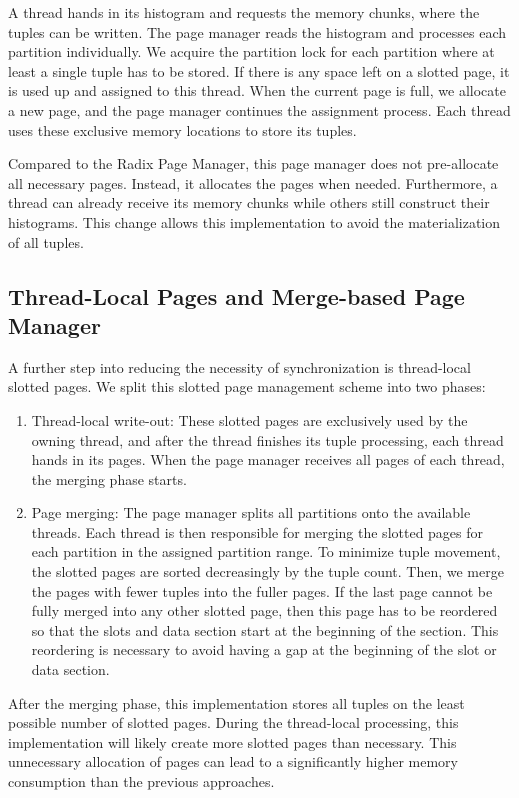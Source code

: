 A thread hands in its histogram and requests the memory chunks, where the tuples can be written.
The page manager reads the histogram and processes each partition individually.
We acquire the partition lock for each partition where at least a single tuple has to be stored.
If there is any space left on a slotted page, it is used up and assigned to this thread.
When the current page is full, we allocate a new page, and the page manager continues the assignment process.
Each thread uses these exclusive memory locations to store its tuples.

Compared to the Radix Page Manager, this page manager does not pre-allocate all necessary pages.
Instead, it allocates the pages when needed.
Furthermore, a thread can already receive its memory chunks while others still construct their histograms.
This change allows this implementation to avoid the materialization of all tuples.
\subsection{Thread-Local Pages and Merge-based Page Manager}\label{subsection-Thread-Local-Pages-Page-Manager}
A further step into reducing the necessity of synchronization is thread-local slotted pages.
We split this slotted page management scheme into two phases:
\begin{enumerate}
  \item Thread-local write-out: These slotted pages are exclusively used by the owning thread, and after the thread finishes its tuple processing, each thread hands in its pages.
        When the page manager receives all pages of each thread, the merging phase starts.

  \item Page merging: The page manager splits all partitions onto the available threads.
        Each thread is then responsible for merging the slotted pages for each partition in the assigned partition range.
        To minimize tuple movement, the slotted pages are sorted decreasingly by the tuple count.
        Then, we merge the pages with fewer tuples into the fuller pages.
        If the last page cannot be fully merged into any other slotted page, then this page has to be reordered so that the slots and data section start at the beginning of the section.
        This reordering is necessary to avoid having a gap at the beginning of the slot or data section.
\end{enumerate}
After the merging phase, this implementation stores all tuples on the least possible number of slotted pages.
During the thread-local processing, this implementation will likely create more slotted pages than necessary.
This unnecessary allocation of pages can lead to a significantly higher memory consumption than the previous approaches.
